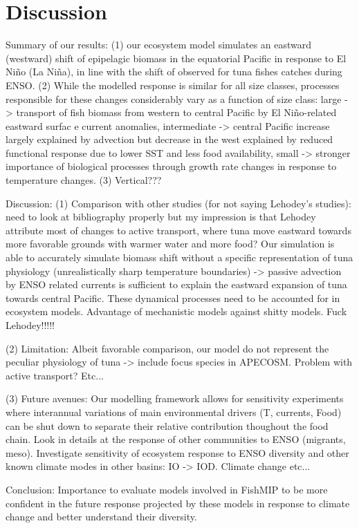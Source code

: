 \section{Discussion}

Summary of our results: 
(1) our ecosystem model simulates an eastward (westward) shift of epipelagic biomass in the equatorial Pacific in response to El Niño (La Niña), in line with the shift of observed for tuna fishes catches during ENSO. 
(2) While the modelled response is similar for all size classes, processes responsible for these changes considerably vary as a function of size class: large -> transport of fish biomass from western to central Pacific by El Niño-related eastward surfac e current anomalies, intermediate -> central Pacific increase largely explained by advection but decrease in the west explained by reduced functional response due to lower SST and less food availability, small -> stronger importance of biological processes through growth rate changes in response to temperature changes. (3) Vertical???

Discussion:
(1) Comparison with other studies (for not saying Lehodey's studies): need to look at bibliography properly but my impression is that Lehodey attribute most of changes to active transport, where tuna move eastward towards more favorable grounds with warmer water and more food? Our simulation is able to accurately simulate biomass shift without a specific representation of tuna physiology (unrealistically sharp temperature boundaries) -> passive advection by ENSO related currents is sufficient to explain the eastward expansion of tuna towards central Pacific. These dynamical processes need to be accounted for in ecosystem models. Advantage of mechanistic models against shitty models. Fuck Lehodey!!!!!

(2) Limitation: Albeit favorable comparison, our model do not represent the peculiar physiology of tuna -> include focus species in APECOSM.  Problem with active transport? Etc...

(3) Future avenues: Our modelling framework allows for sensitivity experiments where interannual variations of main environmental drivers (T, currents, Food) can be shut down to separate their relative contribution thoughout the food chain. Look in details at the response of other communities to ENSO (migrants, meso). Investigate sensitivity of ecosystem response to ENSO diversity and other known climate modes in other basins: IO -> IOD. Climate change etc...

Conclusion: Importance to evaluate models involved in FishMIP to be more confident in the future response projected by these models in response to climate change and better understand their diversity.